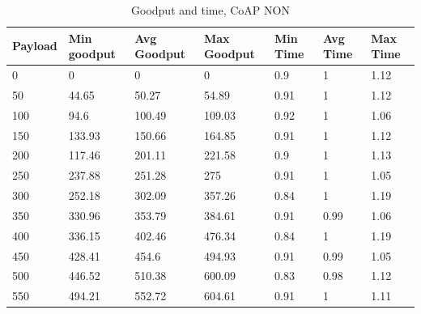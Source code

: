\begin{table}[H]
\scriptsize
\centering
\caption{Goodput and time, CoAP NON}
\label{goodputTimeNON}
\begin{tabular}{|l|l|l|l|l|l|l|}
\hline
\textbf{Payload} & \textbf{Min goodput} & \textbf{Avg Goodput} & \textbf{Max Goodput} & \textbf{Min Time} & \textbf{Avg Time} & \textbf{Max Time} \\ \hline
0                & 0                    & 0                    & 0                    & 0.9               & 1                 & 1.12              \\ \hline
50               & 44.65                & 50.27                & 54.89                & 0.91              & 1                 & 1.12              \\ \hline
100              & 94.6                 & 100.49               & 109.03               & 0.92              & 1                 & 1.06              \\ \hline
150              & 133.93               & 150.66               & 164.85               & 0.91              & 1                 & 1.12              \\ \hline
200              & 117.46               & 201.11               & 221.58               & 0.9               & 1                 & 1.13              \\ \hline
250              & 237.88               & 251.28               & 275                  & 0.91              & 1                 & 1.05              \\ \hline
300              & 252.18               & 302.09               & 357.26               & 0.84              & 1                 & 1.19              \\ \hline
350              & 330.96               & 353.79               & 384.61               & 0.91              & 0.99              & 1.06              \\ \hline
400              & 336.15               & 402.46               & 476.34               & 0.84              & 1                 & 1.19              \\ \hline
450              & 428.41               & 454.6                & 494.93               & 0.91              & 0.99              & 1.05              \\ \hline
500              & 446.52               & 510.38               & 600.09               & 0.83              & 0.98              & 1.12              \\ \hline
550              & 494.21               & 552.72               & 604.61               & 0.91              & 1                 & 1.11              \\ \hline

\end{tabular}
\end{table}
